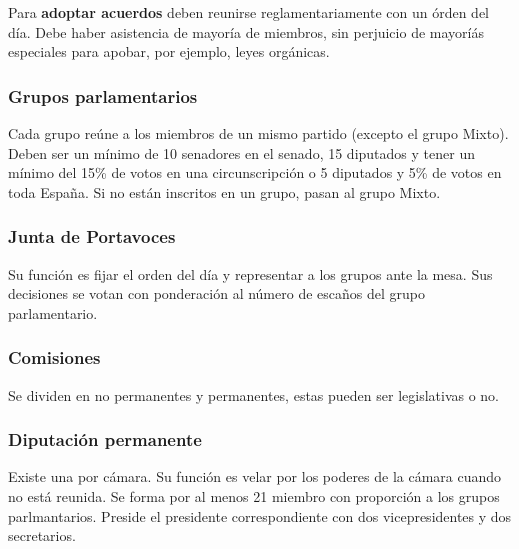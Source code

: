         Para \textbf{adoptar acuerdos} deben reunirse reglamentariamente con un órden del día. Debe haber asistencia de mayoría de miembros, sin perjuicio de mayoríás especiales para apobar, por ejemplo, leyes orgánicas.

    \subsubsection{Grupos parlamentarios} %
        Cada grupo reúne a los miembros de un mismo partido (excepto el grupo Mixto). Deben ser un mínimo de 10 senadores en el senado, 15 diputados y tener un mínimo del 15\% de votos en una circunscripción o 5 diputados y 5\% de votos en toda España. Si no están inscritos en un grupo, pasan al grupo Mixto.

    \subsubsection{Junta de Portavoces}
        Su función es fijar el orden del día y representar a los grupos ante la mesa. Sus decisiones se votan con ponderación al número de escaños del grupo parlamentario.

    \subsubsection{Comisiones}
        Se dividen en no permanentes y permanentes, estas pueden ser legislativas o no.
    \subsubsection{Diputación permanente}
        Existe una por cámara. Su función es velar por los poderes de la cámara cuando no está reunida. Se forma por al menos 21 miembro con proporción a los grupos parlmantarios. Preside el presidente correspondiente con dos vicepresidentes y dos secretarios.

